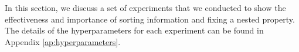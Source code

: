 \documentclass[letterpaper]{article} %
\begin{document}

In this section, we discuss a set of experiments that we conducted to show the effectiveness and importance of sorting information and fixing a nested property. The details of the hyperparameters for each experiment can be found in Appendix \ref{ap:hyperparameters}.





\end{document}
